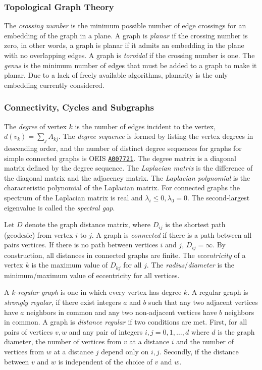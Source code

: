 \documentclass[12pt]{article}
\newcommand{\OEIS}[1]
{\href{https://oeis.org/#1}{\texttt{#1}}}
\begin{document}
\begin{appendices}
\subsubsection*{Topological Graph Theory}

The \textit{crossing number} is the minimum possible number of edge crossings for an embedding of the graph in a plane.
A graph is \textit{planar} if the crossing number is zero, in other words, a graph is planar if it admits an embedding in the plane with no overlapping edges.
A graph is \textit{toroidal} if the crossing number is one.
The \textit{genus} is the minimum number of edges that must be added to a graph to make it planar.
Due to a lack of freely available algorithms, planarity is the only embedding currently considered.

\subsubsection*{Connectivity, Cycles and Subgraphs}

The \textit{degree} of vertex $k$ is the number of edges incident to the vertex, $d(v_k) = \sum_j A_{k j}$. 
The \textit{degree sequence} is formed by listing the vertex degrees in descending order, and the number of distinct degree sequences for graphs for simple connected graphs is OEIS \OEIS{A007721}.
The degree matrix is a diagonal matrix defined by the degree sequence.
The \textit{Laplacian matrix} is the difference of the diagonal matrix and the adjacency matrix.
The \textit{Laplacian polynomial} is the characteristic polynomial of the Laplacian matrix.
For connected graphs the spectrum of the Laplacian matrix is real and $\lambda_i \le 0, \lambda_0 = 0$.
The second-largest eigenvalue is called the \textit{spectral gap}.

Let $D$ denote the graph distance matrix, where $D_{ij}$ is the shortest path (geodesic) from vertex $i$ to $j$.
A graph is \textit{connected} if there is a path between all pairs vertices.
If there is no path between vertices $i$ and $j$, $D_{ij}=\infty$.
By construction, all distances in connected graphs are finite.
The \textit{eccentricity} of a vertex $k$ is the maximum value of $D_{k j}$ for all $j$.
The \textit{radius}/\textit{diameter} is the minimum/maximum value of eccentricity for all vertices.

A \textit{$k$-regular graph} is one in which every vertex has degree $k$. 
A regular graph is \textit{strongly regular}, if there exist integers $a$ and $b$ such that any two adjacent vertices have $a$ neighbors in common and any two non-adjacent vertices have $b$ neighbors in common. 
A graph is \textit{distance regular} if two conditions are met. 
First, for all pairs of vertices $v, w$ and any pair of integers $i,j = 0,1,\ldots,d$ where $d$ is the graph diameter, the number of vertices from $v$ at a distance $i$ and the number of vertices from $w$ at a distance $j$ depend only on $i, j$.
Secondly, if the distance between $v$ and $w$ is independent of the choice of $v$ and $w$\cite{brouwer2012distance}.


\end{appendices}
\end{document}
